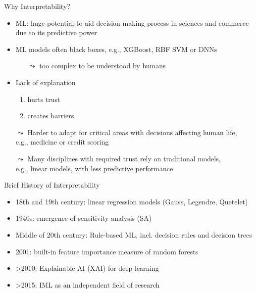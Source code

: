 \documentclass[11pt,compress,t,notes=noshow, aspectratio=169, xcolor=table]{beamer}
\begin{document}
\begin{frame}{Why Interpretability?}
		\begin{itemize}
			\item ML: huge potential to aid decision-making process in sciences and commerce due to its predictive power
			\pause
			\smallskip
			\item ML models often black boxes, e.g., XGBoost, RBF SVM or DNNs
			\begin{itemize}
				\item[$\leadsto$] too complex to be understood by humans
			\end{itemize}
			\pause
			\smallskip
			\item Lack of explanation
			\begin{enumerate}
				\item hurts trust
				\item creates barriers
			\end{enumerate}
			\pause
			\smallskip
		    \item[$\leadsto$] Harder to adapt for critical areas with decisions affecting human life,\\
		    e.g., medicine or credit scoring
			\pause
			\item[$\leadsto$] Many disciplines with required trust rely on traditional models,\\ e.g., linear models, with less predictive performance
		\end{itemize}
	\end{frame}


	\begin{frame}{Brief History of Interpretability}
		\begin{itemize}
			\item 18th and 19th century: linear regression models (Gauss, Legendre, Quetelet)
			\medskip
			\item 1940s: emergence of sensitivity analysis (SA)
			\medskip
			\item Middle of 20th century: Rule-based ML, incl. decision rules and decision trees
			\medskip
			\item 2001: built-in feature importance measure of random forests
			\medskip
			\item >2010: Explainable AI (XAI) for deep learning
			\medskip
			\item >2015: IML as an independent field of research
		\end{itemize}
	\end{frame}
\end{document}
